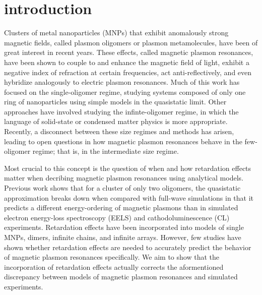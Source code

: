 \documentclass[journal=apchd5,manuscript=article]{achemso}
\begin{document}
\section{introduction}
Clusters of metal nanoparticles (MNPs) that exhibit anomalously strong magnetic fields, called plasmon oligomers or plasmon metamolecules, have been of great interest in recent years. These effects, called magnetic plasmon resonances, have been shown to couple to and enhance the magnetic field of light, exhibit a negative index of refraction at certain frequencies, act anti-reflectively, and even hybridize analogously to electric plasmon resonances\cite{Alu2006,Alu2008,Dionne2011,Cherqui2014,Dionne2016,Cherqui2016,Engheta2017}. Much of this work has focused on the single-oligomer regime, studying systems composed of only one ring of nanoparticles using simple models in the quasistatic limit\cite{Nord2006,Dionne2011,Dionne2016,Capolino2017}. Other approaches have involved studying the infinte-oligomer regime, in which the language of solid-state or condensed matter physics is more appropriate\cite{Schatz2003,Weick2013}. Recently, a disconnect between these size regimes and methods has arisen, leading to open questions in how magnetic plasmon resonances behave in the few-oligomer regime; that is, in the intermediate size regime\cite{NordHal2011,NordHal2012,Cherqui2014,Cherqui2016,Engheta2017}.

Most crucial to this concept is the question of when and how retardation effects matter when decribing magnetic plasmon resonances using analytical models. Previous work shows that for a cluster of only two oligomers, the quasistatic approximation breaks down when compared with full-wave simulations in that it predicts a different energy-ordering of magnetic plasmons than in simulated electron energy-loss spectroscopy (EELS) and cathodoluminescence (CL) experiments\cite{Cherqui2014}. Retardation effects have been incorporated into models of single MNPs, dimers, infinite chains, and infinite arrays\cite{Kottman2001,Rechbacher2003,Schatz2003,Royer2005,vonPlessen2007,Abajo2008,Chumanov2010,Gu2010,Pinchuk2016}. However, few studies have shown whether retardation effects are needed to accurately predict the behavior of magnetic plasmon resonances specifically. We aim to show that the incorporation of retardation effects actually corrects the aformentioned discrepancy between models of magnetic plasmon resonances and simulated experiments.
\end{document}
